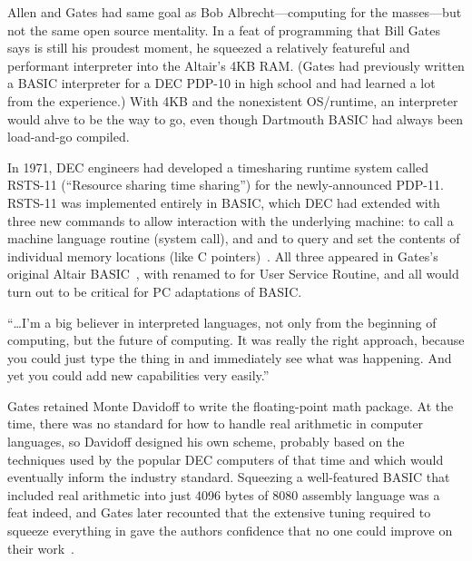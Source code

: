 \documentclass{article}
\begin{document}

Allen and Gates had same goal as Bob Albrecht---computing for the
masses---but not the 
same open source mentality.  In a feat of programming that Bill Gates
says is still his proudest moment, he squeezed a relatively featureful
and performant interpreter into the Altair's 4KB RAM.  (Gates had
previously written a BASIC interpreter for  a DEC PDP-10 in high school and
had learned a lot from the experience.)  With 4KB and the nonexistent
OS/runtime, an interpreter would ahve to be the way to go, even though
Dartmouth BASIC had always been load-and-go compiled.

In 1971, DEC engineers had developed a timesharing runtime system called
RSTS-11 (``Resource sharing time sharing'') for the newly-announced
PDP-11.  
RSTS-11 was implemented entirely in BASIC, 
which DEC had
extended with three new commands to allow interaction with the underlying
machine:  to call a machine language routine (system call), and
 and  to query and set the contents of individual memory
locations (like C pointers)~\cite[pp.~204--205]{ceruzzi}.
All three appeared in Gates's original Altair
BASIC~\cite{smithsonian_interview}, with  
renamed to  for User Service Routine, and
all would turn out to be critical for PC adaptations of 
BASIC. 


``\ldots I'm a big believer in interpreted languages,
not only from the beginning of computing, but the future of
computing. It was really the right approach, because you could just type
the thing in and immediately see what was happening. And yet you could
add new capabilities very easily.'' ~\cite{smithsonian_interview}


Gates retained
Monte Davidoff to write the floating-point math package.
At the time, there was no standard for how to handle real arithmetic in
computer languages, so Davidoff designed his own scheme, probably based
on the techniques used by the popular DEC computers of that time and
which would eventually inform the industry standard.
Squeezing a well-featured BASIC that included real arithmetic into just
4096 bytes of 8080 assembly language was a feat indeed, and Gates later
recounted that the extensive tuning required to squeeze everything in
gave the authors confidence that no one could improve on their
work~\cite{programmers_at_work}. 
\end{document}
